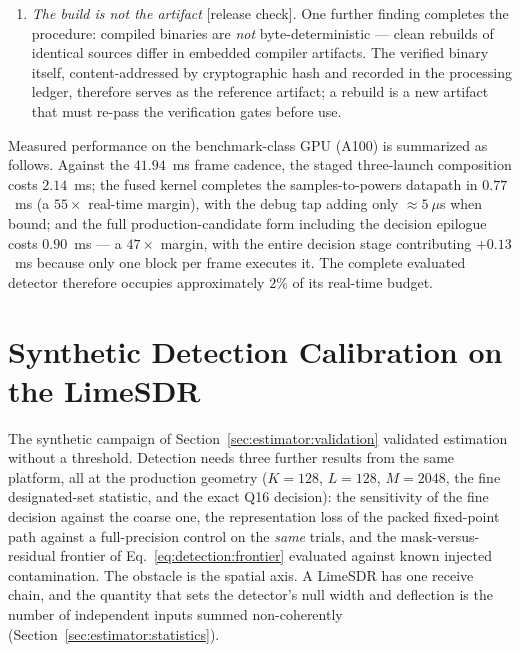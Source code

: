 \begin{enumerate}
    \item \emph{The build is not the artifact} [release check]. One further finding completes the procedure: compiled binaries are \emph{not} byte-deterministic --- clean rebuilds of identical sources differ in embedded compiler artifacts. The verified binary itself, content-addressed by cryptographic hash and recorded in the processing ledger, therefore serves as the reference artifact; a rebuild is a new artifact that must re-pass the verification gates before use.
\end{enumerate}

Measured performance on the benchmark-class GPU (A100) is summarized as follows. Against the $41.94$~ms frame cadence, the staged three-launch composition costs $2.14$~ms; the fused kernel completes the samples-to-powers datapath in $0.77$~ms (a $55\times$ real-time margin), with the debug tap adding only $\approx 5~\mu$s when bound; and the full production-candidate form including the decision epilogue costs $0.90$~ms --- a $47\times$ margin, with the entire decision stage contributing $+0.13$~ms because only one block per frame executes it. The complete evaluated detector therefore occupies approximately $2\%$ of its real-time budget.

\section{Synthetic Detection Calibration on the LimeSDR}
\label{sec:detection:synthetic}
\label{sec:impl:legacyinjection}

The synthetic campaign of Section~\ref{sec:estimator:validation} validated estimation without a threshold. Detection needs three further results from the same platform, all at the production geometry ($K = 128$, $L = 128$, $M = 2048$, the fine designated-set statistic, and the exact Q16 decision): the sensitivity of the fine decision against the coarse one, the representation loss of the packed fixed-point path against a full-precision control on the \emph{same} trials, and the mask-versus-residual frontier of Eq.~\eqref{eq:detection:frontier} evaluated against known injected contamination. The obstacle is the spatial axis. A LimeSDR has one receive chain, and the quantity that sets the detector's null width and deflection is the number of independent inputs summed non-coherently (Section~\ref{sec:estimator:statistics}).

